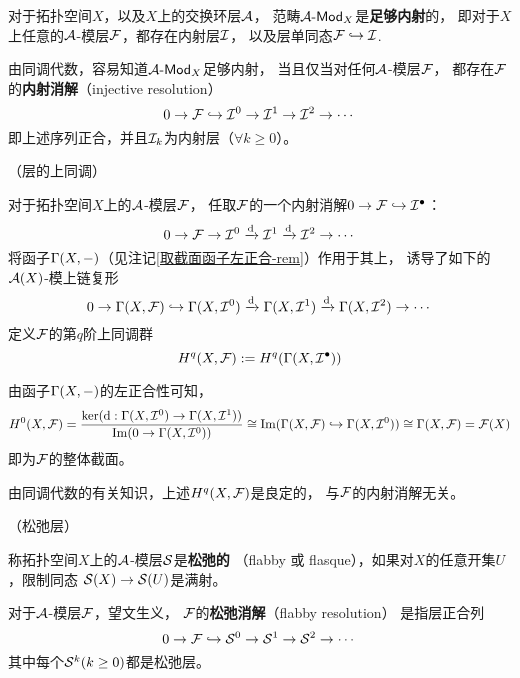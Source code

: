 \begin{thm}对于拓扑空间$X$，以及$X$上的交换环层$\mathcal{A}$，
范畴$\mathcal{A}\operatorname{\!\text{-}\mathsf{Mod}}_X$是\textbf{足够内射}的，
即对于$X$上任意的$\mathcal{A}$-模层$\mathcal{F}$，都存在内射层$\mathcal{I}$，
以及层单同态$\mathcal{F}\hookrightarrow\mathcal{I}$.
\end{thm}
由同调代数，容易知道$\mathcal{A}\operatorname{\!\text{-}\mathsf{Mod}}_X$足够内射，
当且仅当对任何$\mathcal{A}$-模层$\mathcal{F}$，
都存在$\mathcal{F}$的\textbf{内射消解}（injective resolution）
$$
  0\to\mathcal{F}\hookrightarrow\mathcal{I}^0
  \to\mathcal{I}^1\to\mathcal{I}^2\to\cdots
$$
即上述序列正合，并且$\mathcal{I}_k$为内射层（$\forall k\geq 0$）。


\begin{definition}（层的上同调）

对于拓扑空间$X$上的$\mathcal{A}$-模层$\mathcal{F}$，
任取$\mathcal{F}$的一个内射消解$0\to\mathcal{F}\hookrightarrow\mathcal{I}^{\bullet}$：
$$0\to\mathcal{F}\to\mathcal{I}^0\xrightarrow{\mathrm{d}}\mathcal{I}^1\xrightarrow{\mathrm{d}}\mathcal{I}^2\to\cdots$$
将函子$\Gamma(X,-)$（见注记\ref{取截面函子左正合-rem}）作用于其上，
诱导了如下的$\mathcal{A}(X)$-模上链复形
$$0\to\Gamma(X,\mathcal{F})
\hookrightarrow\Gamma(X,\mathcal{I}^0)\xrightarrow{\mathrm{d}}
\Gamma(X,\mathcal{I}^1)\xrightarrow{\mathrm{d}}
\Gamma(X,\mathcal{I}^2)\to\cdots$$
定义$\mathcal{F}$的第$q$阶上同调群
$$H^q(X,\mathcal{F}):=H^q(\Gamma(X,\mathcal{I}^{\bullet}))$$
\end{definition}
由函子$\Gamma(X,-)$的左正合性可知，
$$
  H^0(X,\mathcal{F})
=
  \frac{\ker(\mathrm{d}:\Gamma(X,\mathcal{I}^0)\to\Gamma(X,\mathcal{I}^1))}
       {\operatorname{Im}(0\to\Gamma(X,\mathcal{I}^0))}
\cong
  \operatorname{Im}(\Gamma(X,\mathcal{F})\hookrightarrow\Gamma(X,\mathcal{I}^0))
\cong \Gamma(X,\mathcal{F})=\mathcal{F}(X)
$$
即为$\mathcal{F}$的整体截面。

\begin{rem}
由同调代数的有关知识，上述$H^q(X,\mathcal{F})$是良定的，
与$\mathcal{F}$的内射消解无关。
\end{rem}

\begin{definition}（松弛层）

称拓扑空间$X$上的$\mathcal{A}$-模层$\mathcal{S}$是\textbf{松弛的}
（flabby 或 flasque），如果对$X$的任意开集$U$，限制同态
$\mathcal{S}(X)\to\mathcal{S}(U)$是满射。
\end{definition}

对于$\mathcal{A}$-模层$\mathcal{F}$，望文生义，
$\mathcal{F}$的\textbf{松弛消解}（flabby resolution）
是指层正合列
$$
  0\to\mathcal{F}\hookrightarrow\mathcal{S}^0
  \to\mathcal{S}^1\to\mathcal{S}^2\to\cdots
$$
其中每个$\mathcal{S}^k(k\geq 0)$都是松弛层。

